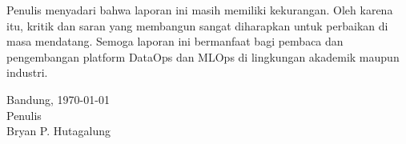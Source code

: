 Penulis menyadari bahwa laporan ini masih memiliki kekurangan. Oleh karena itu, kritik dan saran yang membangun sangat diharapkan untuk perbaikan di masa mendatang. Semoga laporan ini bermanfaat bagi pembaca dan pengembangan platform DataOps dan MLOps di lingkungan akademik maupun industri.

\begin{flushright}
    Bandung, \today\\

    Penulis \\
    \vspace{1cm}
    Bryan P. Hutagalung
\end{flushright}
